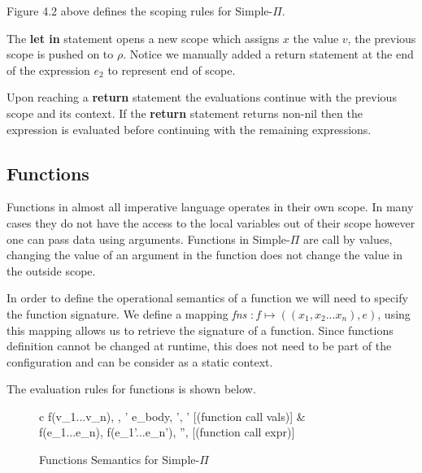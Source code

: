 \documentclass[a4paper,12pt]{report}
\begin{document}
\par
Figure 4.2 above defines the scoping rules for Simple-$\Pi$.

\par
The \textbf{let in} statement opens a new scope which assigns $x$ the value $v$, the 
previous scope is pushed on to $\rho$. Notice we manually added a return 
statement at the end of the expression $e_2$ to represent end of scope. 

\par
Upon reaching a \textbf{return} statement the evaluations continue with the 
previous scope and its context. If the \textbf{return} statement returns non-nil 
then the expression is evaluated before continuing with the remaining 
expressions. 

\subsection{Functions}
Functions in almost all imperative language operates in their own scope. In many 
cases they do not have the access to the local variables out of their scope however 
one can pass data using arguments. Functions in Simple-$\Pi$ are call by values, 
changing the value of an argument in the function does not change the value in 
the outside scope. 

\par
In order to define the operational semantics of a function we will need to 
specify the function signature. We define a mapping \textit{fns} $: f \mapsto ((x_1, x_2...x_n), e)$, 
using this mapping allows us to retrieve the signature of a function. Since functions 
definition cannot be changed at runtime, this does not need to be part of the 
configuration and can be consider as a static context.

\par
The evaluation rules for functions is shown below.
\begin{figure}[H]
  \begin{center}
    \begin{tabular} {c}
      {\langle f(v_1...v_n), \sigma, \rho' \rangle \longrightarrow \langle e_{body}, \sigma', \rho' \rangle} [(function call vals)]
      & \\
      {\langle f(e_1...e_n), \sigma \rangle \longrightarrow \langle f(e_1'...e_n'), \sigma'', \rho \rangle} [(function call expr)]
    \end{tabular}
  \end{center}
  \caption{Functions Semantics for Simple-$\Pi$}
\end{figure}
\end{document}
